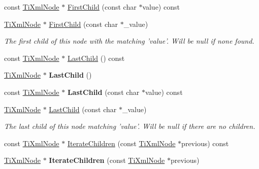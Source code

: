 \begin{DoxyCompactItemize}
\item 
const \hyperlink{class_ti_xml_node}{\-Ti\-Xml\-Node} $\ast$ \hyperlink{class_ti_xml_node_ab5f722624113c8203227de4f56576d31}{\-First\-Child} (const char $\ast$value) const 
\item 
\hypertarget{class_ti_xml_node_abc8bf32be6419ec453a731868de19554}{
\hyperlink{class_ti_xml_node}{\-Ti\-Xml\-Node} $\ast$ \hyperlink{class_ti_xml_node_abc8bf32be6419ec453a731868de19554}{\-First\-Child} (const char $\ast$\-\_\-value)}
\label{class_ti_xml_node_abc8bf32be6419ec453a731868de19554}

\begin{DoxyCompactList}\small\item\em \-The first child of this node with the matching 'value'. \-Will be null if none found. \end{DoxyCompactList}\item 
const \hyperlink{class_ti_xml_node}{\-Ti\-Xml\-Node} $\ast$ \hyperlink{class_ti_xml_node_a6d671107e00cca1d28cb2d7f3a87a21e}{\-Last\-Child} () const 
\item 
\hypertarget{class_ti_xml_node_a6432d2b2495f6caf9cb4278df706a031}{
\hyperlink{class_ti_xml_node}{\-Ti\-Xml\-Node} $\ast$ {\bfseries \-Last\-Child} ()}
\label{class_ti_xml_node_a6432d2b2495f6caf9cb4278df706a031}

\item 
\hypertarget{class_ti_xml_node_acdd3fdc436aa7433023310a041e5e63f}{
const \hyperlink{class_ti_xml_node}{\-Ti\-Xml\-Node} $\ast$ {\bfseries \-Last\-Child} (const char $\ast$value) const }
\label{class_ti_xml_node_acdd3fdc436aa7433023310a041e5e63f}

\item 
\hypertarget{class_ti_xml_node_abad5bf1059c48127b958711ef89e8e5d}{
\hyperlink{class_ti_xml_node}{\-Ti\-Xml\-Node} $\ast$ \hyperlink{class_ti_xml_node_abad5bf1059c48127b958711ef89e8e5d}{\-Last\-Child} (const char $\ast$\-\_\-value)}
\label{class_ti_xml_node_abad5bf1059c48127b958711ef89e8e5d}

\begin{DoxyCompactList}\small\item\em \-The last child of this node matching 'value'. \-Will be null if there are no children. \end{DoxyCompactList}\item 
const \hyperlink{class_ti_xml_node}{\-Ti\-Xml\-Node} $\ast$ \hyperlink{class_ti_xml_node_aaef7ac3978c4bb1cc8a24ffae7bced75}{\-Iterate\-Children} (const \hyperlink{class_ti_xml_node}{\-Ti\-Xml\-Node} $\ast$previous) const 
\item 
\hypertarget{class_ti_xml_node_a2358e747118fdbf0e467b1e4f7d03de1}{
\hyperlink{class_ti_xml_node}{\-Ti\-Xml\-Node} $\ast$ {\bfseries \-Iterate\-Children} (const \hyperlink{class_ti_xml_node}{\-Ti\-Xml\-Node} $\ast$previous)}
\label{class_ti_xml_node_a2358e747118fdbf0e467b1e4f7d03de1}


\end{DoxyCompactItemize}
